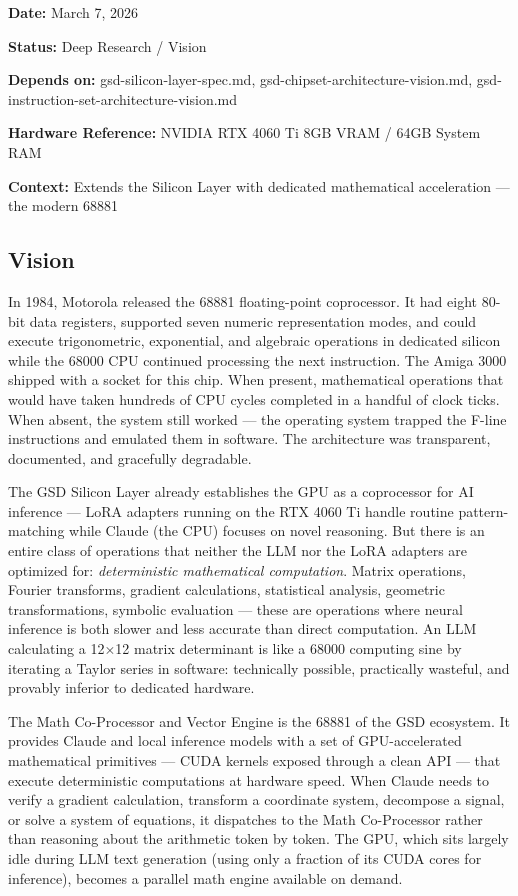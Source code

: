 \documentclass[11pt,letterpaper]{article}
\newcommand{\metafield}[2]{\textbf{\sffamily #1} #2\par}
\begin{document}
\metafield{Date:}{March 7, 2026}
\metafield{Status:}{Deep Research / Vision}
\metafield{Depends on:}{gsd-silicon-layer-spec.md, gsd-chipset-architecture-vision.md, gsd-instruction-set-architecture-vision.md}
\metafield{Hardware Reference:}{NVIDIA RTX 4060 Ti 8GB VRAM / 64GB System RAM}
\metafield{Context:}{Extends the Silicon Layer with dedicated mathematical acceleration --- the modern 68881}

\subsection{Vision}

In 1984, Motorola released the 68881 floating-point coprocessor. It had eight 80-bit data registers, supported seven numeric representation modes, and could execute trigonometric, exponential, and algebraic operations in dedicated silicon while the 68000 CPU continued processing the next instruction. The Amiga 3000 shipped with a socket for this chip. When present, mathematical operations that would have taken hundreds of CPU cycles completed in a handful of clock ticks. When absent, the system still worked --- the operating system trapped the F-line instructions and emulated them in software. The architecture was transparent, documented, and gracefully degradable.

The GSD Silicon Layer already establishes the GPU as a coprocessor for AI inference --- LoRA adapters running on the RTX 4060 Ti handle routine pattern-matching while Claude (the CPU) focuses on novel reasoning. But there is an entire class of operations that neither the LLM nor the LoRA adapters are optimized for: \textit{deterministic mathematical computation}. Matrix operations, Fourier transforms, gradient calculations, statistical analysis, geometric transformations, symbolic evaluation --- these are operations where neural inference is both slower and less accurate than direct computation. An LLM calculating a 12×12 matrix determinant is like a 68000 computing sine by iterating a Taylor series in software: technically possible, practically wasteful, and provably inferior to dedicated hardware.

The Math Co-Processor and Vector Engine is the 68881 of the GSD ecosystem. It provides Claude and local inference models with a set of GPU-accelerated mathematical primitives --- CUDA kernels exposed through a clean API --- that execute deterministic computations at hardware speed. When Claude needs to verify a gradient calculation, transform a coordinate system, decompose a signal, or solve a system of equations, it dispatches to the Math Co-Processor rather than reasoning about the arithmetic token by token. The GPU, which sits largely idle during LLM text generation (using only a fraction of its CUDA cores for inference), becomes a parallel math engine available on demand.
\end{document}
